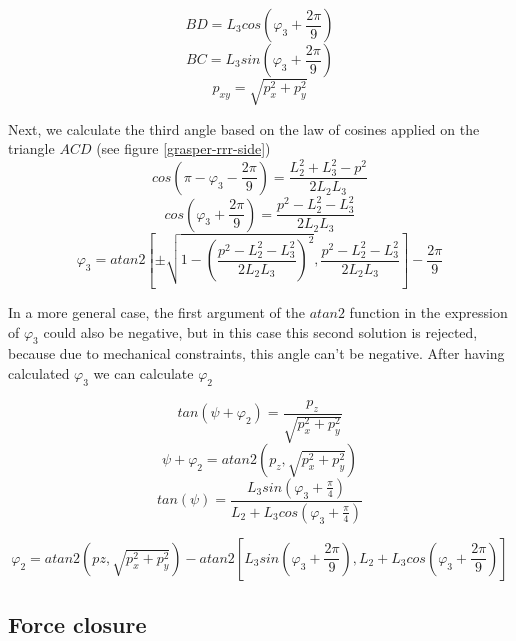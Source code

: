 \begin{equation}
BD = L_3 cos(φ_3 + \frac{2π}{9})
\end{equation}
\begin{equation}
BC = L_3 sin(φ_3 + \frac{2π}{9})
\end{equation}
\begin{equation}
p_{xy} = \sqrt{p_x^2 + p_y^2}
\end{equation}

Next, we calculate the third angle based on the law of cosines applied on the triangle $ACD$ (see figure \ref{grasper-rrr-side})
\begin{equation}
cos \left( π - φ_3 - \frac{2π}{9} \right) = \frac{L_2^2 + L_3^2 - p^2}{2 L_2 L_3}
\end{equation}
\begin{equation}
cos \left(φ_3 + \frac{2π}{9} \right) = \frac{p^2 - L_2^2 - L_3^2}{2 L_2 L_3}
\end{equation}
\begin{equation}
φ_3 = atan2 \left[ \pm \sqrt{1 - \left( \frac{p^2 - L_2^2 - L_3^2}{2 L_2 L_3} \right)^2} , \frac{p^2 - L_2^2 - L_3^2}{2 L_2 L_3} \right] - \frac{2π}{9}
\end{equation}

In a more general case, the first argument of the $atan2$ function in the expression of $φ_3$ could also be negative,
but in this case this second solution is rejected, because due to mechanical constraints, this angle can't be negative. 
After having calculated $φ_3$ we can calculate $φ_2 $

\begin{equation}
tan \left( ψ + φ_2 \right) = \frac{p_z}{\sqrt{p_x^2 + p_y^2}}
\end{equation}
\begin{equation}
ψ + φ_2 = atan2 \left( p_z, \sqrt{p_x^2 + p_y^2} \right)
\end{equation}
\begin{equation}
tan \left( ψ \right) = \frac{L_3 sin \left( φ_3 + \frac{π}{4} \right) }{L_2 + L_3 cos \left( φ_3 + \frac{π}{4} \right)}
\end{equation}

\begin{equation}
φ_2 = atan2 \left( pz, \sqrt{p_x^2 + p_y^2} \right) - atan2 \left[ L_3 sin \left( φ_3 + \frac{2π}{9} \right), L_2 + L_3 cos \left( φ_3 + \frac{2π}{9} \right) \right]
\end{equation}

\subsection{Force closure}

